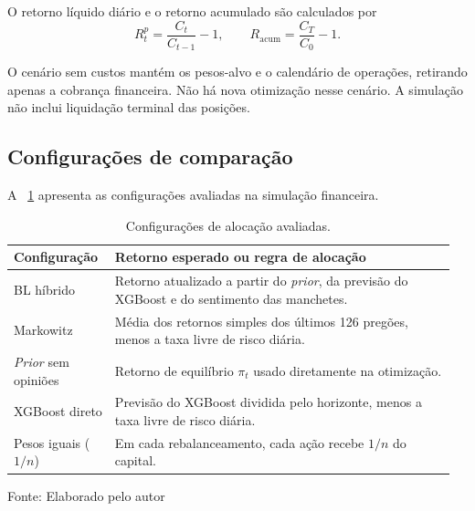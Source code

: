 O retorno líquido diário e o retorno acumulado são
calculados por
\begin{equation}
R_t^{p}
=
\frac{C_t}{C_{t-1}}-1,
\qquad
R_{\mathrm{acum}}
=
\frac{C_T}{C_0}-1.
\label{eq:ret_acumulado_cap4}
\end{equation}

O cenário sem custos mantém os pesos-alvo e o
calendário de operações, retirando apenas a cobrança
financeira. Não há nova otimização nesse cenário.
A simulação não inclui liquidação terminal das
posições.

\subsection{Configurações de comparação}

A ~\ref{tab:configuracoes_alocacao} apresenta as
configurações avaliadas na simulação financeira.

\begin{table}[H]
    \centering
    \caption{Configurações de alocação avaliadas.}
    \label{tab:configuracoes_alocacao}
    {\footnotesize
    \renewcommand{\arraystretch}{1.25}
    \setlength{\tabcolsep}{5pt}
    \begin{tabular}{@{}p{0.22\linewidth}p{0.74\linewidth}@{}}
        \hline
        \textbf{Configuração} &
        \textbf{Retorno esperado ou regra de alocação}
        \tabularnewline
        \hline

        BL híbrido &
        \raggedright Retorno atualizado a partir do \emph{prior},
        da previsão do XGBoost e do sentimento das manchetes.
        \tabularnewline

        Markowitz &
        \raggedright Média dos retornos simples dos últimos
        126 pregões, menos a taxa livre de risco diária.
        \tabularnewline

        \emph{Prior} sem opiniões &
        \raggedright Retorno de equilíbrio $\pi_t$ usado
        diretamente na otimização.
        \tabularnewline

        XGBoost direto &
        \raggedright Previsão do XGBoost dividida pelo horizonte,
        menos a taxa livre de risco diária.
        \tabularnewline

        Pesos iguais ($1/n$) &
        \raggedright Em cada rebalanceamento, cada ação recebe
        $1/n$ do capital.
        \tabularnewline

        \hline
    \end{tabular}}
    \par\smallskip
    Fonte: Elaborado pelo autor
\end{table}

